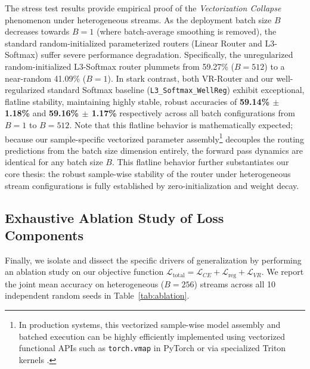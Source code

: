 The stress test results provide empirical proof of the \emph{Vectorization Collapse} phenomenon under heterogeneous streams. As the deployment batch size $B$ decreases towards $B=1$ (where batch-average smoothing is removed), the standard random-initialized parameterized routers (Linear Router and L3-Softmax) suffer severe performance degradation. Specifically, the unregularized random-initialized L3-Softmax router plummets from 59.27\% ($B=512$) to a near-random 41.09\% ($B=1$). In stark contrast, both VR-Router and our well-regularized standard Softmax baseline (\texttt{L3\_Softmax\_WellReg}) exhibit exceptional, flatline stability, maintaining highly stable, robust accuracies of \textbf{59.14\% $\pm$ 1.18\%} and \textbf{59.16\% $\pm$ 1.17\%} respectively across all batch configurations from $B=1$ to $B=512$. Note that this flatline behavior is mathematically expected; because our sample-specific vectorized parameter assembly\footnote{In production systems, this vectorized sample-wise model assembly and batched execution can be highly efficiently implemented using vectorized functional APIs such as \texttt{torch.vmap} in PyTorch \cite{paszke2019pytorch} or via specialized Triton kernels \cite{chen2019triton}.} decouples the routing predictions from the batch size dimension entirely, the forward pass dynamics are identical for any batch size $B$. This flatline behavior further substantiates our core thesis: the robust sample-wise stability of the router under heterogeneous stream configurations is fully established by zero-initialization and weight decay.

\subsection{Exhaustive Ablation Study of Loss Components}
Finally, we isolate and dissect the specific drivers of generalization by performing an ablation study on our objective function $\mathcal{L}_{\text{total}} = \mathcal{L}_{CE} + \mathcal{L}_{\text{reg}} + \mathcal{L}_{VR}$. We report the joint mean accuracy on heterogeneous ($B=256$) streams across all 10 independent random seeds in Table~\ref{tab:ablation}.


